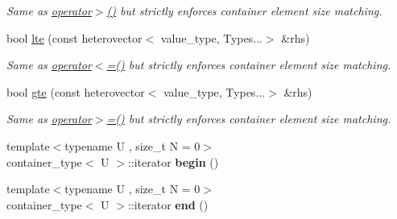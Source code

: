 \begin{DoxyCompactItemize}
\begin{DoxyCompactList}\small\item\em Same as \hyperlink{classheterogeneous_1_1heterovector_3_01_t_00_01_types_8_8_8_4_a5f23c2ca5ffd6bfc52be938b3264d686}{operator$>$()} but strictly enforces container element size matching. \end{DoxyCompactList}\item 
\hypertarget{classheterogeneous_1_1heterovector_3_01_t_00_01_types_8_8_8_4_a810bdb924ea5eab1f9d546e9b0bd0977}{}bool \hyperlink{classheterogeneous_1_1heterovector_3_01_t_00_01_types_8_8_8_4_a810bdb924ea5eab1f9d546e9b0bd0977}{lte} (const heterovector$<$ value\+\_\+type, Types...$>$ \&rhs)\label{classheterogeneous_1_1heterovector_3_01_t_00_01_types_8_8_8_4_a810bdb924ea5eab1f9d546e9b0bd0977}

\begin{DoxyCompactList}\small\item\em Same as \hyperlink{classheterogeneous_1_1heterovector_3_01_t_00_01_types_8_8_8_4_a876ca5d0f0beb3350be5c907bce36e94}{operator$<$=()} but strictly enforces container element size matching. \end{DoxyCompactList}\item 
\hypertarget{classheterogeneous_1_1heterovector_3_01_t_00_01_types_8_8_8_4_a2c87696e719342c5e034bec45a9ef9ab}{}bool \hyperlink{classheterogeneous_1_1heterovector_3_01_t_00_01_types_8_8_8_4_a2c87696e719342c5e034bec45a9ef9ab}{gte} (const heterovector$<$ value\+\_\+type, Types...$>$ \&rhs)\label{classheterogeneous_1_1heterovector_3_01_t_00_01_types_8_8_8_4_a2c87696e719342c5e034bec45a9ef9ab}

\begin{DoxyCompactList}\small\item\em Same as \hyperlink{classheterogeneous_1_1heterovector_3_01_t_00_01_types_8_8_8_4_aa6ff47154ef360efedf6998473b17545}{operator$>$=()} but strictly enforces container element size matching. \end{DoxyCompactList}\item 
\hypertarget{classheterogeneous_1_1heterovector_3_01_t_00_01_types_8_8_8_4_aaa3449bdc9eeb9224cf1c4a7a2d89ea8}{}{\footnotesize template$<$typename U , size\+\_\+t N = 0$>$ }\\container\+\_\+type$<$ U $>$\+::iterator {\bfseries begin} ()\label{classheterogeneous_1_1heterovector_3_01_t_00_01_types_8_8_8_4_aaa3449bdc9eeb9224cf1c4a7a2d89ea8}

\item 
\hypertarget{classheterogeneous_1_1heterovector_3_01_t_00_01_types_8_8_8_4_a05261a5abfac5820d3ed3ba9ce1d6f57}{}{\footnotesize template$<$typename U , size\+\_\+t N = 0$>$ }\\container\+\_\+type$<$ U $>$\+::iterator {\bfseries end} ()\label{classheterogeneous_1_1heterovector_3_01_t_00_01_types_8_8_8_4_a05261a5abfac5820d3ed3ba9ce1d6f57}


\end{DoxyCompactItemize}
